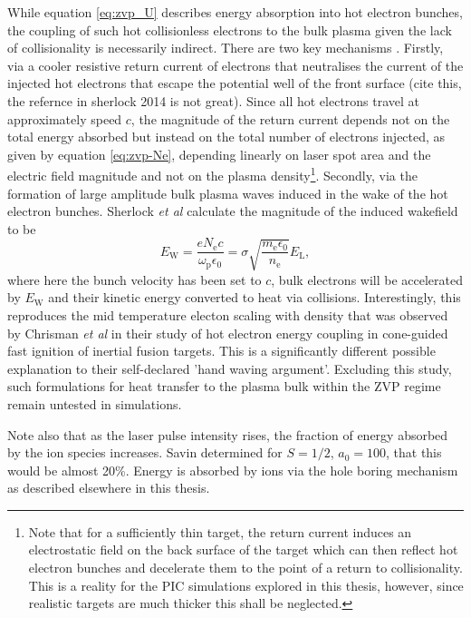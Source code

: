 While equation \ref{eq:zvp_U} describes energy absorption into hot electron bunches, the coupling of such hot collisionless electrons to the bulk plasma given the lack of collisionality is necessarily indirect. There are two key mechanisms \cite{sherlockIndepthPlasmawaveHeating2014}. Firstly, via a cooler resistive return current of electrons that neutralises the current of the injected hot electrons that escape the potential well of the front surface (cite this, the refernce in sherlock 2014 is not great). Since all hot electrons travel at approximately speed $c$, the magnitude of the return current depends not on the total energy absorbed but instead on the total number of electrons injected, as given by equation \ref{eq:zvp-Ne}, depending linearly on laser spot area and the electric field magnitude and not on the plasma density\footnote{Note that for a sufficiently thin target, the return current induces an electrostatic field on the back surface of the target which can then reflect hot electron bunches and decelerate them to the point of a return to collisionality. This is a reality for the PIC simulations explored in this thesis, however, since realistic targets are much thicker this shall be neglected.}. Secondly, via the formation of large amplitude bulk plasma waves induced in the wake of the hot electron bunches. Sherlock \textit{et al} \cite{sherlockIndepthPlasmawaveHeating2014} calculate the magnitude of the induced wakefield to be
\begin{equation}
	E_\mathrm{W} = \frac{eN_\mathrm{e}c}{\omega_\mathrm{p}\epsilon_0} = \sigma \sqrt{\frac{m_\mathrm{e}\epsilon_0}{n_\mathrm{e}}}E_\mathrm{L},
\end{equation}where here the bunch velocity has been set to $c$, bulk electrons will be accelerated by $E_\mathrm{W}$ and their kinetic energy converted to heat via collisions. Interestingly, this reproduces the mid temperature electon scaling with density that was observed by Chrisman \textit{et al} \cite{chrismanIntensityScalingHot2008} in their study of hot electron energy coupling in cone-guided fast ignition of inertial fusion targets. This is a significantly different possible explanation to their self-declared 'hand waving argument'. Excluding this study, such formulations for heat transfer to the plasma bulk within the ZVP regime remain untested in simulations.


Note also that as the laser pulse intensity rises, the fraction of energy absorbed by the ion species increases. Savin \cite{savinModellingLaserPlasmaInteractions2019} determined for $S=1/2$, $a_0 = 100$, that this would be almost 20\%. Energy is absorbed by ions via the hole boring mechanism as described elsewhere in this thesis.


